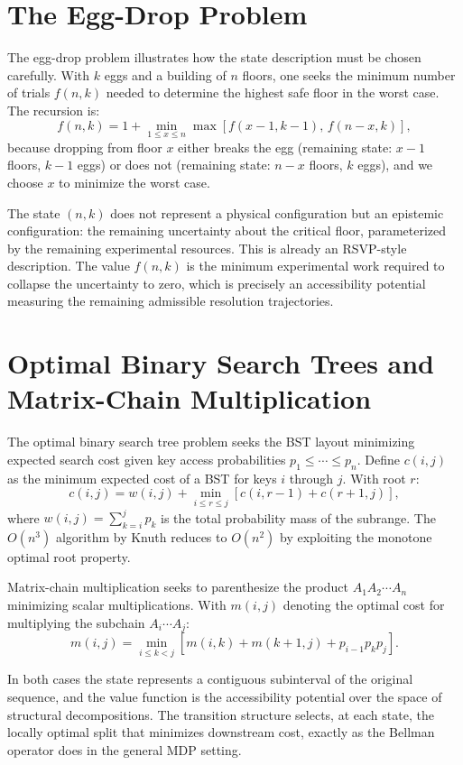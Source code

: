 \documentclass[12pt, a4paper, openany]{book}
\theoremstyle{plain}
\theoremstyle{definition}
\theoremstyle{remark}
\begin{document}
\section{The Egg-Drop Problem}

The egg-drop problem illustrates how the state description must be chosen carefully. With $k$ eggs and a building of $n$ floors, one seeks the minimum number of trials $f(n,k)$ needed to determine the highest safe floor in the worst case. The recursion is:
\[
f(n,k) = 1 + \min_{1 \leq x \leq n} \max\!\left[f(x-1, k-1),\, f(n-x, k)\right],
\]
because dropping from floor $x$ either breaks the egg (remaining state: $x-1$ floors, $k-1$ eggs) or does not (remaining state: $n-x$ floors, $k$ eggs), and we choose $x$ to minimize the worst case.

The state $(n,k)$ does not represent a physical configuration but an epistemic configuration: the remaining uncertainty about the critical floor, parameterized by the remaining experimental resources. This is already an RSVP-style description. The value $f(n,k)$ is the minimum experimental work required to collapse the uncertainty to zero, which is precisely an accessibility potential measuring the remaining admissible resolution trajectories.

\section{Optimal Binary Search Trees and Matrix-Chain Multiplication}

The optimal binary search tree problem seeks the BST layout minimizing expected search cost given key access probabilities $p_1 \leq \cdots \leq p_n$. Define $c(i,j)$ as the minimum expected cost of a BST for keys $i$ through $j$. With root $r$:
\[
c(i,j) = w(i,j) + \min_{i \leq r \leq j}\left[c(i,r-1) + c(r+1,j)\right],
\]
where $w(i,j) = \sum_{k=i}^j p_k$ is the total probability mass of the subrange. The $O(n^3)$ algorithm by Knuth reduces to $O(n^2)$ by exploiting the monotone optimal root property.

Matrix-chain multiplication seeks to parenthesize the product $A_1 A_2 \cdots A_n$ minimizing scalar multiplications. With $m(i,j)$ denoting the optimal cost for multiplying the subchain $A_i \cdots A_j$:
\[
m(i,j) = \min_{i \leq k < j}\left[m(i,k) + m(k+1,j) + p_{i-1} p_k p_j\right].
\]

In both cases the state represents a contiguous subinterval of the original sequence, and the value function is the accessibility potential over the space of structural decompositions. The transition structure selects, at each state, the locally optimal split that minimizes downstream cost, exactly as the Bellman operator does in the general MDP setting.
\end{document}
